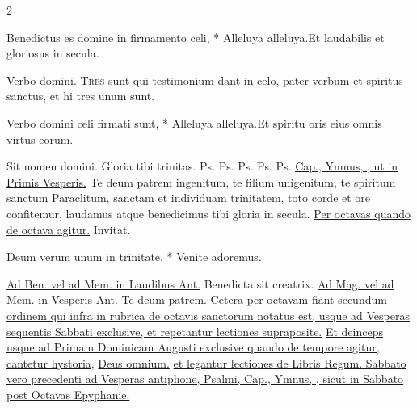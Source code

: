 \begin{multicols*}{2}
\begin{responsory-breve}
{Benedictus es domine in firmamento celi, * Alleluya alleluya.}{Et laudabilis et gloriosus in secula.}
\end{responsory-breve}%
\V Verbo domini.
\lettrine[lines=2]{\zallmancaps \color{Blue} T}{res} sunt qui testimonium dant in celo, pater verbum et spiritus sanctus, et hi tres unum sunt.
\begin{responsory-breve}
{Verbo domini celi firmati sunt, * Alleluya alleluya.}{Et spiritu oris eius omnis virtus eorum.}
\end{responsory-breve}%
\V Sit nomen domini.
 Gloria tibi trinitas. {\color{Red} Ps.}  {\color{Red} Ps.}  {\color{Red} Ps.}  {\color{Red} Ps.}  {\color{Red} Ps.} 
\newline \ul{Cap., Ymnus, \Vbar , ut in Primis Vesperis.}
 Te deum patrem ingenitum, te filium unigenitum, te spiritum sanctum Paraclitum, sanctam et individuam trinitatem, toto corde et ore confitemur, laudamus atque benedicimus tibi gloria in secula.
\newline \ul{Per octavas quando de octava agitur.} {\color{Red} Invitat.}
\begin{invitatory}
{Deum verum unum in trinitate, * Venite adoremus.}
\end{invitatory}
\newline \ul{Ad Ben. vel ad Mem. in Laudibus Ant.} Benedicta sit creatrix.
\newline \ul{Ad Mag. vel ad Mem. in Vesperis Ant.} Te deum patrem.
\newline \ul{Cetera per octavam fiant secundum ordinem qui infra in rubrica de octavis sanctorum notatus est, usque ad Vesperas sequentis Sabbati exclusive, et repetantur lectiones supraposite.}
{\color{Red} }
\newline \ul{Et deinceps usque ad Primam Dominicam Augusti exclusive quando de tempore agitur, cantetur hystoria,} \hyperlink{deus-omnium}{Deus omnium.} \ul{et legantur lectiones de Libris Regum. Sabbato vero precedenti ad Vesperas antiphone, Psalmi, Cap., Ymnus, \Vbar , sicut in Sabbato post Octavas Epyphanie.}

\end{multicols*}
